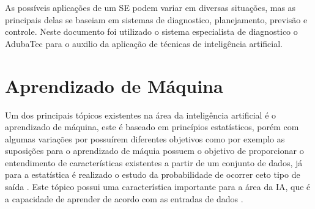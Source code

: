 \documentclass[
12pt,				%
oneside,			%
a4paper,			%
english,			%
french,				%
spanish,			%
brazil				%
]{abntex2}
\begin{document}

  
  

As possíveis aplicações de um SE podem variar em diversas situações, mas as principais delas se baseiam em sistemas de diagnostico, planejamento, previsão e controle. Neste documento foi utilizado o sistema especialista de diagnostico o AdubaTec para o auxilio da aplicação de técnicas de inteligência artificial.  


\section{Aprendizado de Máquina}

Um dos principais tópicos existentes na área da inteligência artificial é o aprendizado de máquina, este é baseado em princípios estatísticos, porém com algumas variações por possuírem diferentes objetivos como por exemplo as suposições para o aprendizado de máquia possuem o objetivo de proporcionar o entendimento de características existentes a partir de um conjunto de dados, já para a estatística é realizado o estudo da probabilidade de ocorrer ceto tipo de saída \cite{faceli2011inteligencia}. Este tópico possui uma característica importante para a área da IA, que é a capacidade de aprender de acordo com as entradas de dados \cite{ViniciusPonte2015}. 
\end{document}
